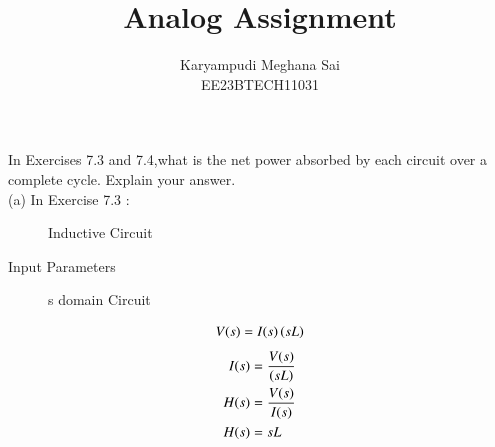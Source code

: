 \documentclass[journal,12pt,onecolumn]{IEEEtran}
\theoremstyle{remark}
\begin{document}
\let\vec\mathbf







\bigskip



\title{Analog Assignment}
\author{Karyampudi Meghana Sai\\ EE23BTECH11031}
\maketitle

In Exercises 7.3 and 7.4,what is the net power absorbed by each circuit over a complete cycle. Explain your answer.\\
\solution
(a) In Exercise 7.3 :
\begin{figure}[h]
	\centering
	
	\caption{Inductive Circuit}
	\label{}
\end{figure}
\begin{table}[h]
 	\centering
 	\resizebox{6 cm}{!}{
 		
 	}
 	\vspace{6 pt}
 	\caption{Input Parameters}
 	\label{table:12.7.5table1} 
 \end{table} 
 \begin{figure}[h]
	\centering
	
	\caption{s domain Circuit}
	\label{}
\end{figure}
\begin{align}
        V(s) = I(s)\left(sL\right) \label{eq:12.7.5eq1}
 \end{align}
\begin{align}
    I(s) &= \dfrac{V(s)}{\left(sL\right)}\label{eq:12.7.5eq2}\\ 
    H(s) &= \dfrac{V(s)}{I(s)}\label{eq:12.7.5eq3}\\
	H(s) &= sL\label{eq:12.7.5eq4}
\end{align}
\end{document}
